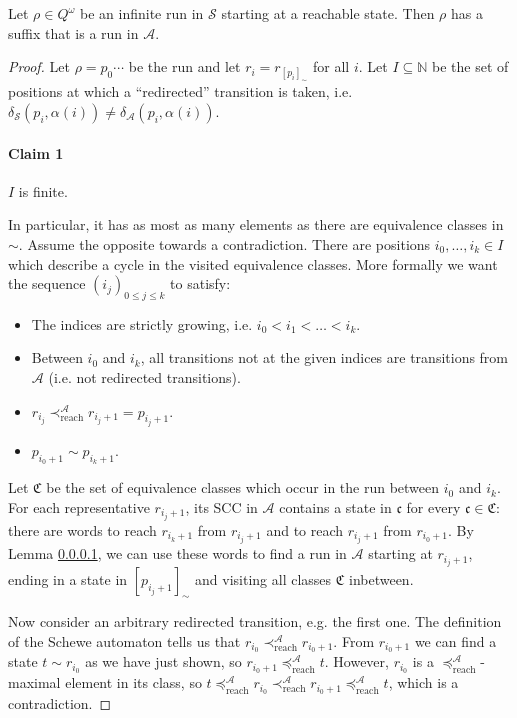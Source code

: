 \begin{lem}
	Let $\rho \in Q^\omega$ be an infinite run in $\mathcal{S}$ starting at a reachable state. Then $\rho$ has a suffix that is a run in $\mathcal{A}$.
\end{lem}

\begin{proof}
	Let $\rho = p_0 \cdots$ be the run and let $r_i = r_{[p_i]_\sim}$ for all $i$. Let $I \subseteq \mathbb{N}$ be the set of positions at which a \enquote{redirected} transition is taken, i.e. $\delta_\mathcal{S}(p_i, \alpha(i)) \neq \delta_\mathcal{A}(p_i, \alpha(i))$.
	
	\paragraph{Claim 1} $I$ is finite.
	
	In particular, it has as most as many elements as there are equivalence classes in $\sim$. Assume the opposite towards a contradiction. There are positions $i_0, \dots, i_k \in I$ which describe a cycle in the visited equivalence classes. More formally we want the sequence $(i_j)_{0 \leq j \leq k}$ to satisfy:
	\begin{itemize}
		\item The indices are strictly growing, i.e. $i_0 < i_1 < \dots < i_k$.
		\item Between $i_0$ and $i_k$, all transitions not at the given indices are transitions from $\mathcal{A}$ (i.e. not redirected transitions).
		\item $r_{i_j} \prec_\text{reach}^\mathcal{A} r_{i_j + 1} = p_{i_j + 1}$.
		\item $p_{i_0 + 1} \sim p_{i_k + 1}$.
	\end{itemize}
	
	Let $\mathfrak{C}$ be the set of equivalence classes which occur in the run between $i_0$ and $i_k$. For each representative $r_{i_j + 1}$, its SCC in $\mathcal{A}$ contains a state in $\mathfrak{c}$ for every $\mathfrak{c} \in \mathfrak{C}$: there are words to reach $r_{i_k + 1}$ from $r_{i_j + 1}$ and to reach $r_{i_j + 1}$ from $r_{i_0 + 1}$. By Lemma \ref{}, we can use these words to find a run in $\mathcal{A}$ starting at $r_{i_j + 1}$, ending in a state in $[p_{i_j + 1}]_\sim$ and visiting all classes $\mathfrak{C}$ inbetween.
	
	Now consider an arbitrary redirected transition, e.g. the first one. The definition of the Schewe automaton tells us that $r_{i_0} \prec_\text{reach}^\mathcal{A} r_{i_0 + 1}$. From $r_{i_0 + 1}$ we can find a state $t \sim r_{i_0}$ as we have just shown, so $r_{i_0 + 1} \preceq_\text{reach}^\mathcal{A} t$. However, $r_{i_0}$ is a $\preceq_\text{reach}^\mathcal{A}$-maximal element in its class, so $t \preceq_\text{reach}^\mathcal{A} r_{i_0} \prec_\text{reach}^\mathcal{A} r_{i_0 + 1} \preceq_\text{reach}^\mathcal{A} t$, which is a contradiction.
	

\end{proof}
